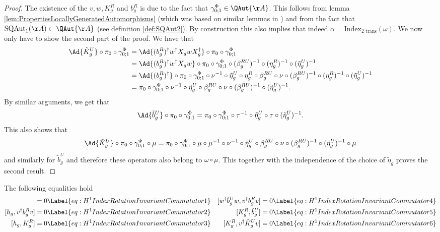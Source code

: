 \begin{proof}
	The existence of the $v,w,K_g^R$ and $b_g^R$ is due to the fact that $\gamma^\Phi_{0;1}\in \QAut{\AA}$. This follows from lemma \ref{lem:PropertiesLocallyGeneratedAutomorphisms} (which was based on similar lemmas in \cite{Ogata2d}) and from the fact that $\textrm{SQAut}_1(\AA)\subset \QAut{\AA}$ (see definition \ref{def:SQAut2}). By construction this also implies that indeed $\alpha=\textrm{Index}_{\text{2 trans}}(\omega)$. We now only have to show the second part of the proof. We have that
	\begin{align}
		\Ad{\tilde{K}_g^U}\circ\pi_0\circ\gamma^\Phi_{0;1}&=\Ad{(b_g^R)^\dagger w^\dagger X_g w X_g^\dagger}\circ\pi_0\circ\gamma^\Phi_{0;1}\\
		&=\Ad{(b_g^R)^\dagger w^\dagger X_g w}\circ\pi_0\circ\gamma^\Phi_{0;1}\circ(\beta_g^{RU})^{-1}\circ(\eta_g^R)^{-1}\circ(\tilde{\eta}_g^U)^{-1}\\
		&=\Ad{(b_g^R)^\dagger}\circ\pi_0\circ\gamma^\Phi_{0;1}\circ\nu^{-1}\circ\tilde{\eta}_g^U\circ\eta_g^R\circ\beta_g^{RU}\circ\nu\circ(\beta_g^{RU})^{-1}\circ(\eta_g^R)^{-1}\circ(\tilde{\eta}_g^U)^{-1}\\
		&=\pi_0\circ\gamma^\Phi_{0;1}\circ\nu^{-1}\circ\tilde{\eta}_g^U\circ\beta_g^{RU}\circ\nu\circ(\beta_g^{RU})^{-1}\circ(\tilde{\eta}_g^U)^{-1}.
	\end{align}
	By similar arguments, we get that
	\begin{equation}
		\Ad{\tilde{b}_g^U}\circ\pi_0\circ\gamma^\Phi_{0;1}=\pi_0\circ\gamma^\Phi_{0;1}\circ\tau^{-1}\circ\tilde{\eta}_g^U\circ\tau\circ(\tilde{\eta}_g^U)^{-1}.
	\end{equation}
	This also shows that
	\begin{equation}
		\Ad{\tilde{K}_g^U}\circ\pi_0\circ\gamma^\Phi_{0;1}\circ\mu=\pi_0\circ\gamma^\Phi_{0;1}\circ\mu\circ\mu^{-1}\circ\nu^{-1}\circ\tilde{\eta}_g^U\circ\beta_g^{RU}\circ\nu\circ(\beta_g^{RU})^{-1}\circ(\tilde{\eta}_g^U)^{-1}\circ\mu
	\end{equation}
	and similarly for $\tilde{b}_g^U$ and therefore these operators also belong to $\omega\circ\mu$. This together with the independence of the choice of $\tilde{\eta}_g$ proves the second result.
\end{proof}
\begin{lemma}
	The following equalities hold
	\begin{align*}
		[h_g ,w^\dagger \tilde{b}_g^U w]&=0 \Label{eq:H^1IndexRotationInvariantCommutator1}& [w^\dagger \tilde{b}_g^U w,v^\dagger b_g^R v]&=0 \Label{eq:H^1IndexRotationInvariantCommutator4}\\
		[h_g, v^\dagger b_g^R v]&=0 \Label{eq:H^1IndexRotationInvariantCommutator2}& [K_g^R,\tilde{b}_g^U] &= 0 \Label{eq:H^1IndexRotationInvariantCommutator5}\\
		[h_g ,K_g^R]&=0 \Label{eq:H^1IndexRotationInvariantCommutator3}& [K_g^R,v^\dagger \tilde{K}^U_g v] &= 0 \Label{eq:H^1IndexRotationInvariantCommutator6}
	\end{align*}
\end{lemma}
